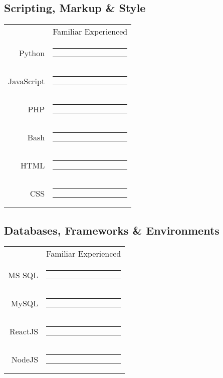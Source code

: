 \documentclass[11pt]{article} 						%
\newcommand{\smpad}{\hspace*{.2em}}
\begin{document}
\begin{multicols}{2}
{{\begin{minipage}[t][\paperheight]{.38\textwidth}
\begin{minipage}[t][\paperheight]{.95\textwidth}
\subsection{\large\dotfill Scripting, Markup \& Style\dotfill}
\vspace{-1ex}\hspace{3em}
\begin{tabularx}{\textwidth}{@{}r@{}c@{}}
	\hfill & \footnotesize Familiar \hspace*{1.7em} Experienced\\
	Python \smpad&%
		\color{skillLvl}\rule[.25ex]{9em}{1ex}%
		\color{skillBkgd}\rule[.25ex]{1em}{1ex}\\
	JavaScript \smpad&%
		\color{skillLvl}\rule[.25ex]{8em}{1ex}%
		\color{skillBkgd}\rule[.25ex]{2em}{1ex}\\
	PHP \smpad&%
		\color{skillLvl}\rule[.25ex]{5em}{1ex}%
		\color{skillBkgd}\rule[.25ex]{5em}{1ex}\\
	Bash \smpad&%
		\color{skillLvl}\rule[.25ex]{3em}{1ex}%
		\color{skillBkgd}\rule[.25ex]{7em}{1ex}\\
	HTML \smpad&%
		\color{skillLvl}\rule[.25ex]{9em}{1ex}%
		\color{skillBkgd}\rule[.25ex]{1em}{1ex}\\
	CSS \smpad&%
		\color{skillLvl}\rule[.25ex]{9em}{1ex}%
		\color{skillBkgd}\rule[.25ex]{1em}{1ex}\\
\end{tabularx}
\vspace{-1ex}
\subsection{\large\dotfill Databases, Frameworks \& Environments\dotfill}
\vspace{-1ex}\hspace{4.25em}
\begin{tabularx}{\textwidth}{@{}r@{}c@{}}
	\hfill & \footnotesize Familiar \hspace*{1.7em} Experienced\\
	MS SQL \smpad&%
		\color{skillLvl}\rule[.25ex]{7em}{1ex}%
		\color{skillBkgd}\rule[.25ex]{3em}{1ex}\\
	MySQL \smpad&%
		\color{skillLvl}\rule[.25ex]{7em}{1ex}%
		\color{skillBkgd}\rule[.25ex]{3em}{1ex}\\
	ReactJS \smpad&%
		\color{skillLvl}\rule[.25ex]{2em}{1ex}%
		\color{skillBkgd}\rule[.25ex]{8em}{1ex}\\
	NodeJS \smpad&%
		\color{skillLvl}\rule[.25ex]{2em}{1ex}%
		\color{skillBkgd}\rule[.25ex]{8em}{1ex}\\
\end{tabularx}
\vspace{-1ex}

\end{minipage}
\end{minipage}}}
\end{multicols}
\end{document}
